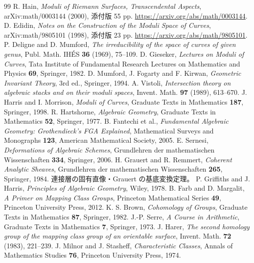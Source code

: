 \documentclass[dvipdfmx,a4paper,11pt]{article}
\theoremstyle{definition}
\begin{document}
\clearpage
\begingroup\small{}
\begin{thebibliography}{99}
 R. Hain, \emph{Moduli of Riemann Surfaces, Transcendental Aspects}, arXiv:math/0003144 (2000), 添付版 55 pp.\newline
\url{https://arxiv.org/abs/math/0003144}.
 D. Edidin, \emph{Notes on the Construction of the Moduli Space of Curves}, arXiv:math/9805101 (1998), 添付版 23 pp.\newline
\url{https://arxiv.org/abs/math/9805101}.
 P. Deligne and D. Mumford, \emph{The irreducibility of the space of curves of given genus}, Publ. Math. IH\'ES \textbf{36} (1969), 75--109.
 D. Gieseker, \emph{Lectures on Moduli of Curves}, Tata Institute of Fundamental Research Lectures on Mathematics and Physics \textbf{69}, Springer, 1982.
 D. Mumford, J. Fogarty and F. Kirwan, \emph{Geometric Invariant Theory}, 3rd ed., Springer, 1994.
 A. Vistoli, \emph{Intersection theory on algebraic stacks and on their moduli spaces}, Invent. Math. \textbf{97} (1989), 613--670.
 J. Harris and I. Morrison, \emph{Moduli of Curves}, Graduate Texts in Mathematics \textbf{187}, Springer, 1998.
 R. Hartshorne, \emph{Algebraic Geometry}, Graduate Texts in Mathematics \textbf{52}, Springer, 1977.
 B. Fantechi et al., \emph{Fundamental Algebraic Geometry: Grothendieck's FGA Explained}, Mathematical Surveys and Monographs \textbf{123}, American Mathematical Society, 2005.
 E. Sernesi, \emph{Deformations of Algebraic Schemes}, Grundlehren der mathematischen Wissenschaften \textbf{334}, Springer, 2006.
 H. Grauert and R. Remmert, \emph{Coherent Analytic Sheaves}, Grundlehren der mathematischen Wissenschaften \textbf{265}, Springer, 1984. 連接層の固有直像・Grauert の基底変換定理。
 P. Griffiths and J. Harris, \emph{Principles of Algebraic Geometry}, Wiley, 1978.
 B. Farb and D. Margalit, \emph{A Primer on Mapping Class Groups}, Princeton Mathematical Series \textbf{49}, Princeton University Press, 2012.
 K. S. Brown, \emph{Cohomology of Groups}, Graduate Texts in Mathematics \textbf{87}, Springer, 1982.
 J.-P. Serre, \emph{A Course in Arithmetic}, Graduate Texts in Mathematics \textbf{7}, Springer, 1973.
 J. Harer, \emph{The second homology group of the mapping class group of an orientable surface}, Invent. Math. \textbf{72} (1983), 221--239.
 J. Milnor and J. Stasheff, \emph{Characteristic Classes}, Annals of Mathematics Studies \textbf{76}, Princeton University Press, 1974.

\end{thebibliography}
\end{document}
